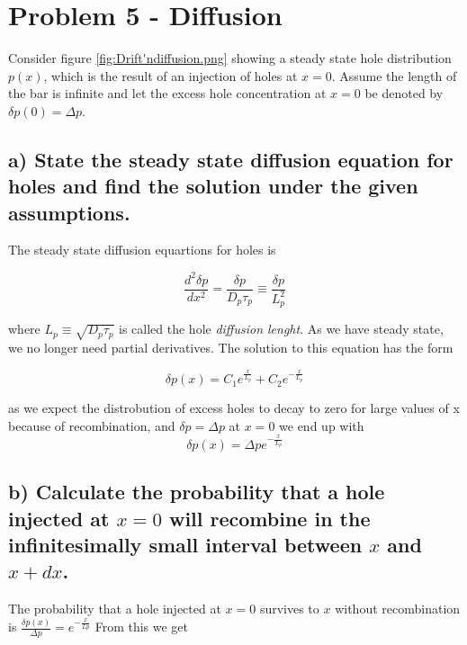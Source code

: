 \section{Problem 5 - Diffusion}
Consider figure \ref{fig:Drift'ndiffusion.png} showing a steady state hole distribution \( p(x) \), which is the result of an injection of holes at \( x=0 \). Assume the length of the bar is infinite and let the excess hole concentration at \( x=0 \) be denoted by \( \delta p(0)=\Delta p \).


\subsection*{a) State the steady state diffusion equation for holes and find the solution under the given assumptions.}

The steady state diffusion equartions for holes is

\begin{equation*}
    \frac{d^{2} \delta p}{d x^{2}}=\frac{\delta p}{D_{p} \tau_{p}} \equiv \frac{\delta p}{L_{p}^{2}} 
\end{equation*}

where $L_p\equiv \sqrt{D_p\tau_p}$ is called the hole \textit{diffusion lenght}. As we have steady state, we no longer need partial derivatives.  The solution to this equation has the form


\begin{equation*}
    \delta p(x) = C_1 e^{\frac{x}{L_p}}+ C_2 e^{-\frac{x}{L_p}}
\end{equation*}

as we expect the distrobution of excess holes to decay to zero for large values of x because of recombination, and $\delta p = \Delta p$ at $x=0$ we end up with
\begin{equation*}
    \delta p(x) = \Delta p e^{-\frac{x}{L_p}}
\end{equation*}

\subsection*{b) Calculate the probability that a hole injected at $x = 0$ will recombine in the infinitesimally small interval between $x$ and $x + dx$.}

The probability that a hole injected at $x = 0$ survives to $x$ without recombination is $\frac{\delta p(x)}{\Delta p}=e^{-\frac{x}{Lp}}$ From this we get

